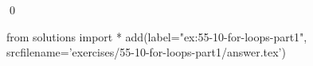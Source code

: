 
\begin{ex}
  \label{ex:55-10-for-loops-part1}
  
  \qed
\end{ex}
\begin{python0}
from solutions import *
add(label="ex:55-10-for-loops-part1",
    srcfilename='exercises/55-10-for-loops-part1/answer.tex')
\end{python0}
